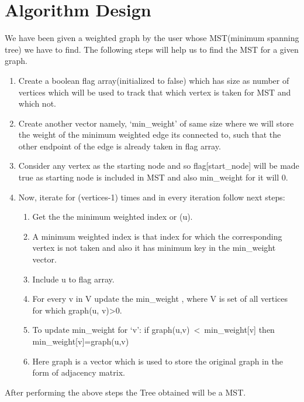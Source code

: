 \documentclass[conference]{IEEEtran}
\begin{document}
\section{Algorithm Design}
We have been given a weighted graph by the user whose MST(minimum spanning tree) we have to find. The following steps will help us to find the MST for a given graph.
\begin{enumerate}
\item Create a boolean flag array(initialized to false) which has size as number of vertices which will be used to track that which vertex is taken for MST and which not.
\item Create another vector namely, ‘min\_weight’ of same size where we will store the weight of the minimum weighted edge its connected to, such that the other endpoint of the edge is already taken in flag array.
\item Consider any vertex as the starting node and so flag[start\_node] will be made true as starting node is included in MST and also min\_weight for it will 0.
\item Now, iterate for (vertices-1) times and in every iteration follow next steps:
\begin{enumerate}
    \item Get the the minimum weighted index or (u).
    \item A minimum weighted index is that index for which the corresponding vertex is not taken and also it has minimum key in the min\_weight vector.
    \item Include u to flag array.
    \item For every v in V update the min\_weight , where V is set of all vertices for which graph(u, v)>0.
    \item To update min\_weight for ‘v’: if graph(u,v)\ <\ min\_weight[v] then min\_weight[v]=graph(u,v)
    \item Here graph is a vector which is used to store the original graph in the form of adjacency matrix.
\end{enumerate}
\end{enumerate}
After performing the above steps the Tree obtained will be a MST.
\end{document}
